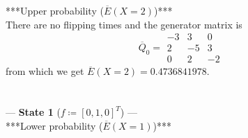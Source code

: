 \documentclass{article}
\begin{document}
***Upper probability ($\overline{E}(X=2)$)***\\

There are no flipping times and the generator matrix is 
\begin{equation*} 
 \overline{Q}_{0}= 
 \begin{array}{|rrr|}
  -3 & 3 & 0 \\
  2 & -5 & 3 \\
  0 & 2 & -2  
 \end{array}
\end{equation*}
from which we get $\overline{E}(X=2)= 0.4736841978$.\\\\\\

--- \textbf{State 1} ($f\coloneqq[0,1,0]^T$) ---\\

***Lower probability ($\overline{E}(X=1)$)***\\
\end{document}
